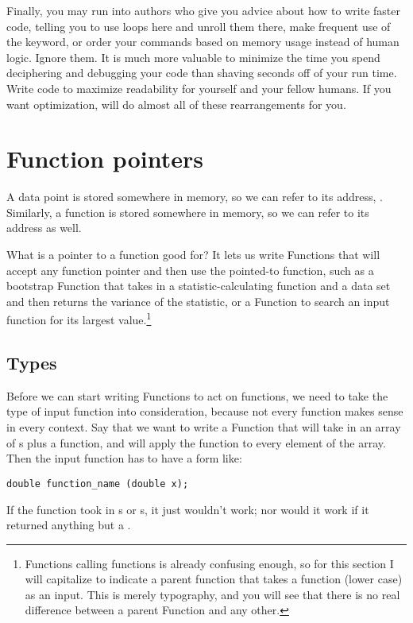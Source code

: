Finally, you may run into authors who give you advice about how to write
faster code, telling you to use loops here and unroll them there, make
frequent use of the  keyword, or order your commands based
on memory usage instead of human logic. Ignore them. It is much more
valuable to minimize the time you spend deciphering and debugging your
code than shaving seconds off of your run time.  Write code to maximize
readability for yourself and your fellow humans. If you want optimization,
 will do almost all of these rearrangements for you.


\section{Function pointers} 
A data point  is stored somewhere in memory, so we can refer to
its address, . Similarly, a function  is stored somewhere
in memory, so we can refer to its address as well.

What is a pointer to a function good for?  It lets us write
Functions that will accept any function pointer and then use the
pointed-to function, such as a bootstrap Function that takes in a
statistic-calculating function and a data set and then returns the
variance of the statistic, or a Function to search an input function
for its largest value.\footnote{Functions calling functions is already
confusing enough, so for this section I will capitalize 
to indicate a parent function that takes a function (lower case) as an
input. This is merely typography, and you will see that there is no real
difference between a parent Function and any other.}

\subsection{Types} Before we can start writing Functions to act on
functions, we need to take the type of input function into
consideration, because not every function makes sense in every context. Say
that we want to write a Function that will take in an array of
s plus a function, and will apply the function to every
element of the array. Then the input function has to have a form like:
\begin{lstlisting}
double function_name (double x);
\end{lstlisting}

If the function took in s or s, it just
wouldn't work; nor would it work if it returned anything but a
.

